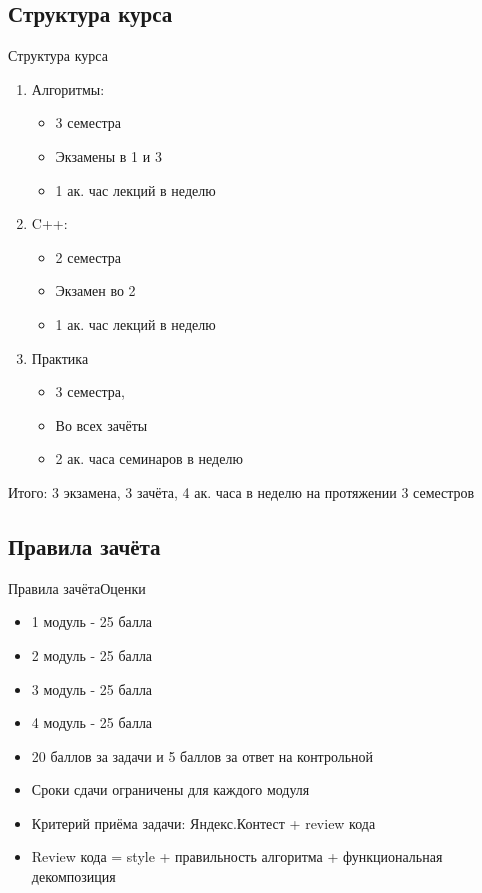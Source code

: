 \documentclass[10pt]{beamer}
\begin{document}
\subsection{Структура курса}
\begin{frame}[fragile]{Структура курса}
\begin{enumerate}
\item Алгоритмы:
    \begin {itemize}
        \item 3 семестра
        \item Экзамены в 1 и 3
        \item 1 ак. час лекций в неделю
    \end {itemize}
\item C++:
    \begin {itemize}
        \item 2 семестра
        \item Экзамен во 2
        \item 1 ак. час лекций в неделю
    \end {itemize}
\item Практика
    \begin {itemize}
        \item 3 семестра,
        \item Во всех зачёты
        \item 2 ак. часа семинаров в неделю
    \end {itemize}
\end{enumerate}
Итого: 3 экзамена, 3 зачёта, 4 ак. часа в неделю на протяжении 3 семестров
\end{frame}


\subsection{Правила зачёта}
\begin{frame}[fragile]{Правила зачёта}{Оценки}
\begin{itemize}
\item 1 модуль - 25 балла
\item 2 модуль - 25 балла
\item 3 модуль - 25 балла
\item 4 модуль - 25 балла
\item 20 баллов за задачи и 5 баллов за ответ на контрольной
\item Сроки сдачи ограничены для каждого модуля
\item Критерий приёма задачи: Яндекс.Контест + review кода
\item Review кода = style + правильность алгоритма + функциональная декомпозиция
\end{itemize}
\end{frame}
\end{document}
